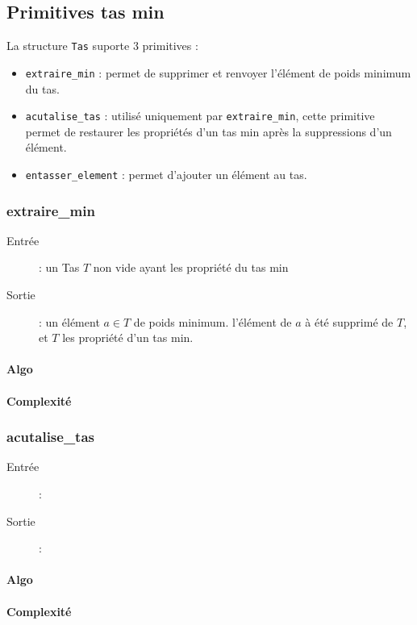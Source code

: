 \documentclass[a4paper,11pt]{article}
\begin{document}
\subsection{Primitives tas min} %
La structure \texttt{Tas} suporte 3 primitives :
\begin{itemize}
\item \texttt{extraire\_min} : permet de supprimer et renvoyer l’élément de poids minimum du tas.
\item \texttt{acutalise\_tas} : utilisé uniquement par \texttt{extraire\_min}, cette primitive permet de restaurer les propriétés d'un tas min après la suppressions d'un élément.
\item \texttt{entasser\_element} : permet d'ajouter un élément au tas.
\end{itemize}
\subsubsection*{extraire\_min}
\begin{description}
\item[Entrée] : un \textsf{Tas} $T$ non vide ayant les propriété du tas min
\item[Sortie] : un élément $a \in T$ de poids minimum. l'élément de $a$ à été supprimé de $T$, et $T$  les propriété d'un tas min.
\end{description}
\paragraph*{Algo}
\paragraph*{Complexité}

\subsubsection*{acutalise\_tas}
\begin{description}
\item[Entrée] : 
\item[Sortie] : 
\end{description}
\paragraph*{Algo}
\paragraph*{Complexité}
\end{document}
